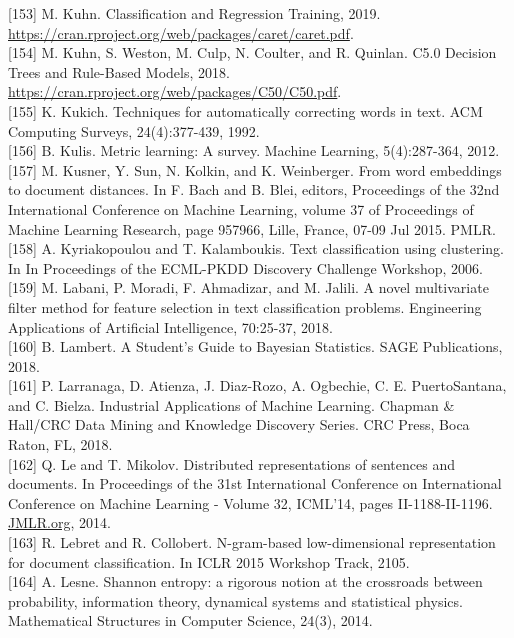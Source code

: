 \documentclass[10pt]{book}
\begin{document}
[153] M. Kuhn. Classification and Regression Training, 2019. \href{https://cran.rproject.org/web/packages/caret/caret.pdf}{https://cran.rproject.org/web/packages/caret/caret.pdf}.\\[0pt]
[154] M. Kuhn, S. Weston, M. Culp, N. Coulter, and R. Quinlan. C5.0 Decision Trees and Rule-Based Models, 2018. \href{https://cran.rproject.org/web/packages/C50/C50.pdf}{https://cran.rproject.org/web/packages/C50/C50.pdf}.\\[0pt]
[155] K. Kukich. Techniques for automatically correcting words in text. ACM Computing Surveys, 24(4):377-439, 1992.\\[0pt]
[156] B. Kulis. Metric learning: A survey. Machine Learning, 5(4):287-364, 2012.\\[0pt]
[157] M. Kusner, Y. Sun, N. Kolkin, and K. Weinberger. From word embeddings to document distances. In F. Bach and B. Blei, editors, Proceedings of the 32nd International Conference on Machine Learning, volume 37 of Proceedings of Machine Learning Research, page 957966, Lille, France, 07-09 Jul 2015. PMLR.\\[0pt]
[158] A. Kyriakopoulou and T. Kalamboukis. Text classification using clustering. In In Proceedings of the ECML-PKDD Discovery Challenge Workshop, 2006.\\[0pt]
[159] M. Labani, P. Moradi, F. Ahmadizar, and M. Jalili. A novel multivariate filter method for feature selection in text classification problems. Engineering Applications of Artificial Intelligence, 70:25-37, 2018.\\[0pt]
[160] B. Lambert. A Student's Guide to Bayesian Statistics. SAGE Publications, 2018.\\[0pt]
[161] P. Larranaga, D. Atienza, J. Diaz-Rozo, A. Ogbechie, C. E. PuertoSantana, and C. Bielza. Industrial Applications of Machine Learning. Chapman \& Hall/CRC Data Mining and Knowledge Discovery Series. CRC Press, Boca Raton, FL, 2018.\\[0pt]
[162] Q. Le and T. Mikolov. Distributed representations of sentences and documents. In Proceedings of the 31st International Conference on International Conference on Machine Learning - Volume 32, ICML'14, pages II-1188-II-1196. \href{http://JMLR.org}{JMLR.org}, 2014.\\[0pt]
[163] R. Lebret and R. Collobert. N-gram-based low-dimensional representation for document classification. In ICLR 2015 Workshop Track, 2105.\\[0pt]
[164] A. Lesne. Shannon entropy: a rigorous notion at the crossroads between probability, information theory, dynamical systems and statistical physics. Mathematical Structures in Computer Science, 24(3), 2014.\\[0pt]
\end{document}
